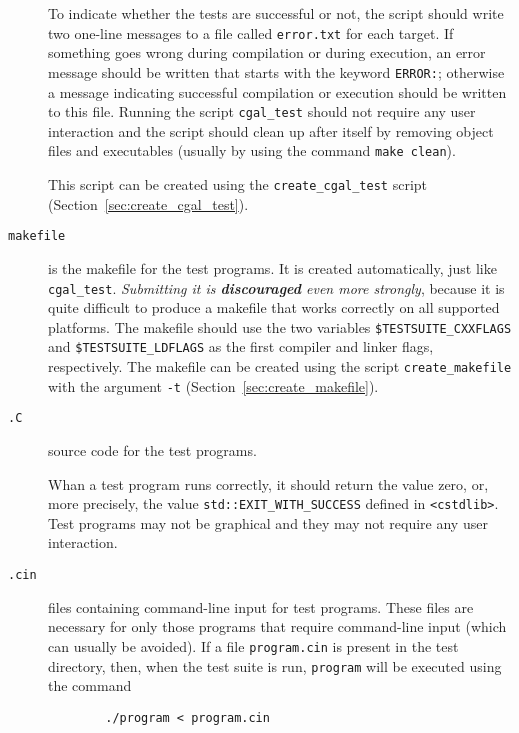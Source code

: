 \begin{description}
        To indicate whether the tests are successful or not, the script should 
        write two one-line messages to a file called {\tt error.txt}
        for each target. If something 
        goes wrong during compilation or during execution, an error message 
        should be written that starts with the keyword {\tt ERROR:}; otherwise
        a message indicating successful compilation or execution should be
        written to this file. Running the script {\tt cgal\_test} should not 
        require any user interaction and the script should clean up after 
        itself by removing object files and executables (usually by using the
        command {\tt make clean}).

        This script can be created using the 
        {\tt create\_cgal\_test}%
        script (Section~\ref{sec:create_cgal_test}).  

   \item[{\tt makefile}] 
        is the makefile for the test programs. It is created
        automatically, just like {\tt cgal\_test}. {\em Submitting it is 
        {\bf discouraged} even more strongly}, because it is quite difficult 
        to produce a makefile that works correctly on all supported platforms.
        The makefile should use
        the two variables \verb|$TESTSUITE_CXXFLAGS| 
        and \verb|$TESTSUITE_LDFLAGS| 
        as the first compiler and linker flags,
        respectively.  The makefile can be created using the script
        {\tt create\_makefile}%
        with the argument {\tt -t} 
        (Section~\ref{sec:create_makefile}).
   \item[{\tt *.C}] source code for the test programs.

        Whan a test program runs correctly, it should return
         the
	value zero, or, more precisely, the value \verb|std::EXIT_WITH_SUCCESS|
        defined in \verb|<cstdlib>|.
        Test programs may not be graphical and they may not require any user 
        interaction.   
   \item[{\tt *.cin}] files containing command-line input for 
        test programs.  These files are necessary for only those programs 
        that require command-line input (which can usually be avoided).  
        If a file \texttt{program.cin} is 
        present in the test directory, then, when the test suite is run,
        \texttt{program} will be executed using the command
        \begin{verbatim}
        ./program < program.cin
        \end{verbatim}
\end{description} 
